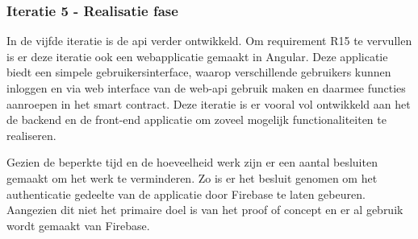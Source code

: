 \subsubsection{Iteratie 5 - Realisatie fase}
In de vijfde iteratie is de api verder ontwikkeld. Om requirement R15 te vervullen is er deze iteratie ook een webapplicatie gemaakt in Angular. Deze applicatie biedt een simpele gebruikersinterface, waarop verschillende gebruikers kunnen inloggen en via web interface van de web-api gebruik maken en daarmee functies aanroepen in het smart contract. Deze iteratie is er vooral vol ontwikkeld aan het de backend en de front-end applicatie om zoveel mogelijk functionaliteiten te realiseren.\par

Gezien de beperkte tijd en de hoeveelheid werk zijn er een aantal besluiten gemaakt om het werk te verminderen. Zo is er het besluit genomen om het authenticatie gedeelte van de applicatie door Firebase te laten gebeuren. Aangezien dit niet het primaire doel is van het proof of concept en er al gebruik wordt gemaakt van Firebase.